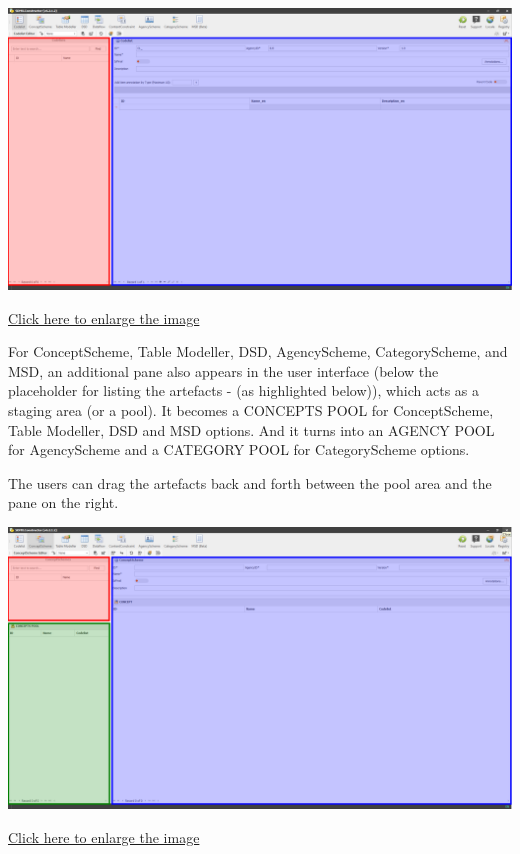 \documentclass[
]{book}
\begin{document}
\begin{center}\includegraphics[width=1\linewidth]{./images/image040} \end{center}

\href{images/image040.png}{Click here to enlarge the image}

For ConceptScheme, Table Modeller, DSD, AgencyScheme, CategoryScheme, and MSD, an additional pane also appears in the user interface (below the placeholder for listing the artefacts - (as highlighted below)), which acts as a staging area (or a pool). It becomes a CONCEPTS POOL for ConceptScheme, Table Modeller, DSD and MSD options. And it turns into an AGENCY POOL for AgencyScheme and a CATEGORY POOL for CategoryScheme options.

The users can drag the artefacts back and forth between the pool area and the pane on the right.

\begin{center}\includegraphics[width=1\linewidth]{./images/image042} \end{center}

\href{images/image042.png}{Click here to enlarge the image}
\end{document}
